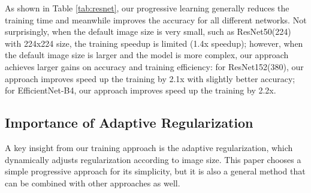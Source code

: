 \documentclass{article}
\begin{document}
\begin{table}[!h]
    \vskip -0.1in
    \centering
    \caption{
        Progressive learning for ResNets and EfficientNets -- (224) and (380) denote the targeted inference image size. Our progressive training improves both the accuracy and training time for all different networks.
       }
    \label{tab:resnet}
\end{table} 
As shown in Table \ref{tab:resnet}, our progressive learning generally reduces the training time and meanwhile improves the accuracy for all different networks. Not surprisingly, when the default image size is very small, such as ResNet50(224) with 224x224  size, the training speedup is limited (1.4x speedup); however, when the default image size is larger and the model is more complex, our approach achieves larger gains on accuracy and training efficiency: for ResNet152(380), our approach improves speed up the training by 2.1x with slightly better accuracy;  for EfficientNet-B4, our approach improves speed up the training by 2.2x.


\subsection{Importance of Adaptive Regularization}

A key insight from our training approach is the adaptive regularization, which dynamically adjusts regularization according to image size. This paper chooses a simple progressive approach for its simplicity, but it is also a general method that can be combined with other approaches as well.
\end{document}
